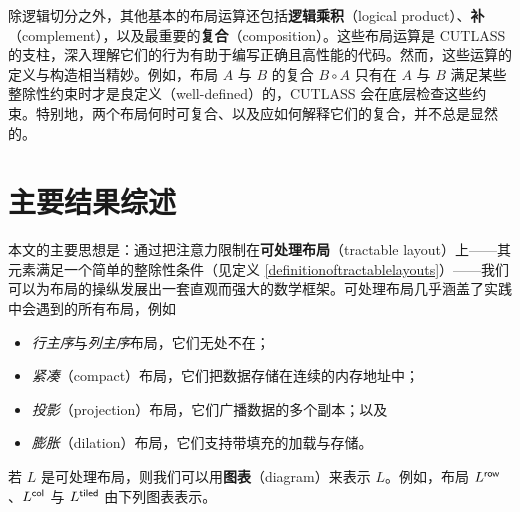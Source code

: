 除逻辑切分之外，其他基本的布局运算还包括{\bf 逻辑乘积}（logical product）、{\bf 补}（complement），以及最重要的{\bf 复合}（composition）。这些布局运算是 CUTLASS 的支柱，深入理解它们的行为有助于编写正确且高性能的代码。然而，这些运算的定义与构造相当精妙。例如，布局 $A$ 与 $B$ 的复合 $B \circ A$ 只有在 $A$ 与 $B$ 满足某些整除性约束时才是良定义（well-defined）的，CUTLASS 会在底层检查这些约束。特别地，两个布局何时可复合、以及应如何解释它们的复合，并不总是显然的。




\section{主要结果综述}

本文的主要思想是：通过把注意力限制在{\bf 可处理布局}（tractable layout）上——其元素满足一个简单的整除性条件（见定义 \ref{definitionoftractablelayouts}）——我们可以为布局的操纵发展出一套直观而强大的数学框架。可处理布局几乎涵盖了实践中会遇到的所有布局，例如
\begin{itemize}
\item {\it 行主序}与{\it 列主序}布局，它们无处不在；
\item {\it 紧凑}（compact）布局，它们把数据存储在连续的内存地址中；
\item {\it 投影}（projection）布局，它们广播数据的多个副本；以及
\item {\it 膨胀}（dilation）布局，它们支持带填充的加载与存储。
\end{itemize}
若 $L$ 是可处理布局，则我们可以用{\bf 图表}（diagram）来表示 $L$。例如，布局 $L^{\mathsf{row}}$、$L^{\mathsf{col}}$ 与 $L^{\mathsf{tiled}}$ 由下列图表表示。

